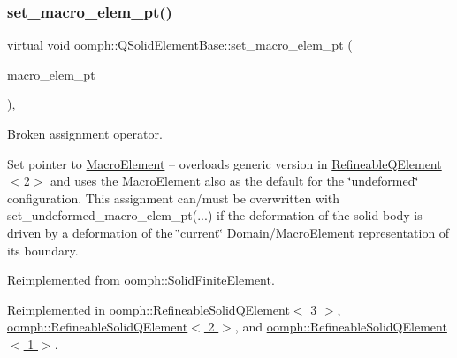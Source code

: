 \mbox{\label{classoomph_1_1QSolidElementBase_a0ceca47c039bbb38b0feb3baa330a27f}} 
\subsubsection{\texorpdfstring{set\+\_\+macro\+\_\+elem\+\_\+pt()}{set\_macro\_elem\_pt()}\hspace{0.1cm}{\footnotesize\ttfamily [1/2]}}
{\footnotesize\ttfamily virtual void oomph\+::\+Q\+Solid\+Element\+Base\+::set\+\_\+macro\+\_\+elem\+\_\+pt (\begin{DoxyParamCaption}\item[{\hyperlink{classoomph_1_1MacroElement}{Macro\+Element} $\ast$}]{macro\+\_\+elem\+\_\+pt }\end{DoxyParamCaption})\hspace{0.3cm}{\ttfamily [inline]}, {\ttfamily [virtual]}}



Broken assignment operator. 

Set pointer to \hyperlink{classoomph_1_1MacroElement}{Macro\+Element} -- overloads generic version in \hyperlink{classoomph_1_1RefineableQElement_3_012_01_4}{Refineable\+Q\+Element$<$2$>$} and uses the \hyperlink{classoomph_1_1MacroElement}{Macro\+Element} also as the default for the \char`\"{}undeformed\char`\"{} configuration. This assignment can/must be overwritten with set\+\_\+undeformed\+\_\+macro\+\_\+elem\+\_\+pt(...) if the deformation of the solid body is driven by a deformation of the \char`\"{}current\char`\"{} Domain/\+Macro\+Element representation of it\textquotesingle{}s boundary. 

Reimplemented from \hyperlink{classoomph_1_1SolidFiniteElement_a07ac4c27457c64d9479c64ae8289daaf}{oomph\+::\+Solid\+Finite\+Element}.



Reimplemented in \hyperlink{classoomph_1_1RefineableSolidQElement_3_013_01_4_a2b1aa7874048e0f38370ae7bf761d315}{oomph\+::\+Refineable\+Solid\+Q\+Element$<$ 3 $>$}, \hyperlink{classoomph_1_1RefineableSolidQElement_3_012_01_4_aac8a230631c509dd854d71a5f68b6483}{oomph\+::\+Refineable\+Solid\+Q\+Element$<$ 2 $>$}, and \hyperlink{classoomph_1_1RefineableSolidQElement_3_011_01_4_ae0cd264bee16dd1d05d35f79e33dd408}{oomph\+::\+Refineable\+Solid\+Q\+Element$<$ 1 $>$}.



